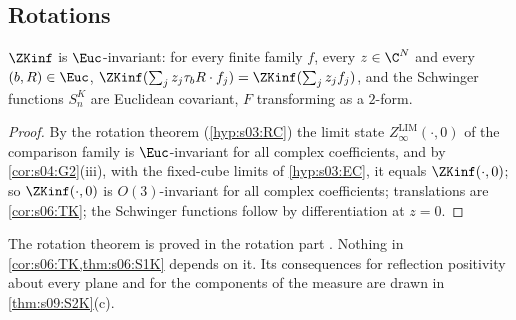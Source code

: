 \subsection{Rotations}

\begin{theorem}[rotations]\label{thm:s06:O3}
$\ZKinf$ is $\Euc$-invariant: for every finite family $f$, every $z\in\C^N$ and every $(b,R)\in\Euc$, $\ZKinf(\sum_jz_j\tau_bR\cdot f_j)=\ZKinf(\sum_jz_jf_j)$, and the Schwinger functions $S^K_n$ are Euclidean covariant, $F$ transforming as a $2$-form.
\end{theorem}

\begin{proof}
By the rotation theorem (\cref{hyp:s03:RC}) the limit state $Z^{\mathrm{LIM}}_\infty(\cdot,0)$ of the comparison family is $\Euc$-invariant for all complex coefficients, and by \cref{cor:s04:G2}(iii), with the fixed-cube limits of \cref{hyp:s03:EC}, it equals $\ZKinf(\cdot,0)$; so $\ZKinf(\cdot,0)$ is $O(3)$-invariant for all complex coefficients; translations are \cref{cor:s06:TK}; the Schwinger functions follow by differentiation at $z=0$.
\end{proof}

The rotation theorem is proved in the rotation part . Nothing in \cref{cor:s06:TK,thm:s06:S1K} depends on it. Its consequences for reflection positivity about every plane and for the components of the measure are drawn in \cref{thm:s09:S2K}(c).
